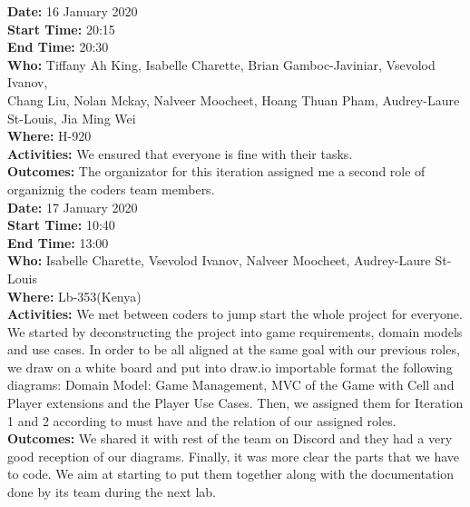 \documentclass[12pt]{article}
\begin{document}
{\bf Date:} 16 January 2020\\
{\bf Start Time:} 20:15\\
{\bf End Time:} 20:30\\
{\bf Who:} Tiffany Ah King, Isabelle Charette, Brian Gamboc-Javiniar, Vsevolod Ivanov,\\
Chang Liu, Nolan Mckay, Nalveer Moocheet, Hoang Thuan Pham, Audrey-Laure St-Louis, Jia Ming Wei\\
{\bf Where:} H-920\\
{\bf Activities:} We ensured that everyone is fine with their tasks.\\
{\bf Outcomes:} The organizator for this iteration assigned me a second role of organiznig the coders team members.\\

{\bf Date:} 17 January 2020\\
{\bf Start Time:} 10:40\\
{\bf End Time:} 13:00\\
{\bf Who:} Isabelle Charette, Vsevolod Ivanov, Nalveer Moocheet, Audrey-Laure St-Louis\\
{\bf Where:} Lb-353(Kenya)\\
{\bf Activities:} We met between coders to jump start the whole project for everyone. We started by deconstructing the project into game requirements, domain models and use cases. In order to be all aligned at the same goal with our previous roles, we draw on a white board and put into draw.io importable format the following diagrams: Domain Model: Game Management, MVC of the Game with Cell and Player extensions and the Player Use Cases. Then, we assigned them for Iteration 1 and 2 according to must have and the relation of our assigned roles.\\
{\bf Outcomes:} We shared it with rest of the team on Discord and they had a very good reception of our diagrams. Finally, it was more clear the parts that we have to code. We aim at starting to put them together along with the documentation done by its team during the next lab.\\


\end{document}
